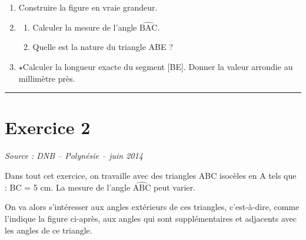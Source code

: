 \documentclass[11pt,a4paper]{article}
\newcommand{\horsprog}{\textbf{\large $\star$}\;}
\newcommand{\source}[1]{%
    \begin{flushright}
        \small\itshape Source : #1
    \end{flushright}
}
\newcommand{\separation}{%
    \vspace{0.4cm}
    \hrule
    \vspace{0.7cm}
}
\begin{document}
\medskip

\begin{enumerate}

\item Construire la figure en vraie grandeur.

\item
    \begin{enumerate}
    \item Calculer la mesure de l'angle $\widehat{\text{BAC}}$.
    \item Quelle est la nature du triangle ABE ?
    \end{enumerate}

\item \horsprog Calculer la longueur exacte du segment [BE].
Donner la valeur arrondie au millimètre près.

\end{enumerate}


\separation



\section*{Exercice 2}

\source{DNB -- Polynésie -- juin 2014}

Dans tout cet exercice, on travaille avec des triangles ABC isocèles
en A tels que : BC = 5 cm. La mesure de l'angle
$\widehat{\text{ABC}}$ peut varier.

\smallskip

On va alors s'intéresser aux angles extérieurs de ces triangles,
c'est-à-dire, comme l'indique la figure ci-après, aux angles qui sont
supplémentaires et adjacents avec les angles de ce triangle.
\end{document}
